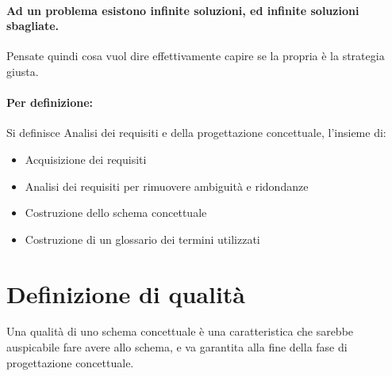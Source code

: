 \documentclass[12pt, a4paper, openany, twoside]{book}
\begin{document}
\paragraph{Ad un problema esistono infinite soluzioni, ed infinite soluzioni
sbagliate.} Pensate quindi cosa vuol dire effettivamente capire se la propria è
la strategia giusta.
\paragraph{Per definizione:} Si definisce Analisi dei requisiti e della progettazione
concettuale, l'insieme di:
\begin{itemize}
	\item Acquisizione dei requisiti
	\item Analisi dei requisiti per rimuovere ambiguità e ridondanze
	\item Costruzione dello schema concettuale
	\item Costruzione di un glossario dei termini utilizzati
\end{itemize}
\section{Definizione di qualità}
Una qualità di uno schema concettuale è una caratteristica che sarebbe auspicabile
fare avere allo schema, e va garantita alla fine della fase di progettazione
concettuale.
\end{document}
